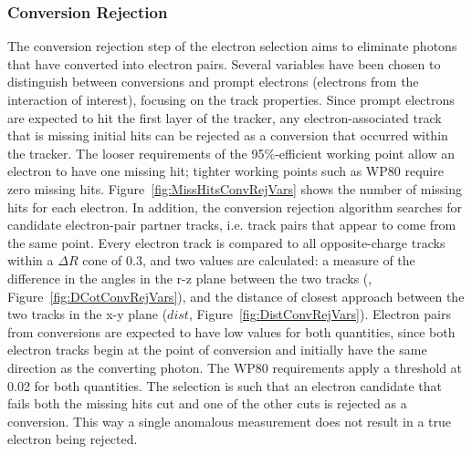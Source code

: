 \subsubsection{Conversion Rejection}
\label{evSel:convRej}
The conversion rejection step of the electron selection aims 
to eliminate photons that have converted into electron pairs.  
Several variables have been chosen to distinguish between 
conversions and prompt electrons 
(electrons from the interaction of interest), 
focusing on the track properties.  
Since prompt electrons are expected to hit the first layer of the tracker, 
any electron-associated track that is missing initial hits 
can be rejected as a conversion that occurred within the tracker.  
The looser requirements of the 95\%-efficient working point 
allow an electron to have one missing hit;
tighter working points such as WP80 require zero missing hits.  
Figure~\ref{fig:MissHitsConvRejVars} shows the number 
of missing hits for each electron.  
In addition, the conversion rejection algorithm searches 
for candidate electron-pair partner tracks, 
i.e. track pairs that appear to come from the same point.  
Every electron track is compared to all opposite-charge tracks 
within a $\Delta R$ cone of 0.3, and two values are calculated: 
a measure of the difference in the angles in the r-z plane 
between the two tracks (\dCotTheta, Figure~\ref{fig:DCotConvRejVars}), 
and the distance of closest approach between the two tracks 
in the x-y plane ($dist$, Figure~\ref{fig:DistConvRejVars}).  
Electron pairs from conversions are expected 
to have low values for both quantities, 
since both electron tracks begin at the point of conversion 
and initially have the same direction as the converting photon.  
The WP80 requirements apply a threshold at 0.02 for both quantities.  
The selection is such that an electron candidate 
that fails both the missing hits cut 
and one of the other cuts is rejected as a conversion.  
This way a single anomalous measurement does not 
result in a true electron being rejected.  

